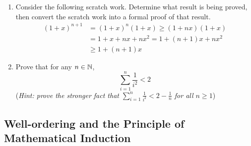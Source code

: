 \begin{exercises}{}{}
\begin{enumerate}
		\item Consider the following scratch work. Determine what result is being proved, then convert the scratch work into a formal proof of that result.
	    \begin{align*}
	      (1+x)^{n+1}&=(1+x)^n(1+x)\ge (1+nx)(1+x)\\
	      &= 1+x+nx+nx^2=1+(n+1)x+nx^2\\
	      &\ge 1+(n+1)x
	    \end{align*}
	
		\item Prove that for any $n\in\mathbb{N}$,
		\[
	    \sum_{i=1}^n\frac{1}{i^2}<2	
		\]
		(\emph{Hint: prove the stronger fact that $\sum_{i=1}^n \frac{1}{i^2} < 2 - \frac{1}{n}$ for all $n \ge 1$})
	\end{enumerate}

\end{exercises}

\clearpage


\subsection{Well-ordering and the Principle of Mathematical Induction}\label{sec:wellorder}



%   
%     
  
